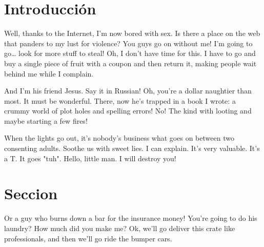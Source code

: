 \documentclass[10pt]{informe_db} %
\begin{document}
\flushbottom %

\maketitle %

\tableofcontents %

\thispagestyle{empty} %


\section*{Introducción} %


Well, thanks to the Internet, I'm now bored with sex. Is there a place on the web that panders to my lust for violence? You guys go on without me! I'm going to go… look for more stuff to steal! Oh, I don't have time for this. I have to go and buy a single piece of fruit with a coupon and then return it, making people wait behind me while I complain.

And I'm his friend Jesus. Say it in Russian! Oh, you're a dollar naughtier than most. It must be wonderful. There, now he's trapped in a book I wrote: a crummy world of plot holes and spelling errors! No! The kind with looting and maybe starting a few fires!

When the lights go out, it's nobody's business what goes on between two consenting adults. Soothe us with sweet lies. I can explain. It's very valuable. It's a T. It goes "tuh". Hello, little man. I will destroy you!



\section{Seccion}
Or a guy who burns down a bar for the insurance money! You're going to do his laundry? How much did you make me? Ok, we'll go deliver this crate like professionals, and then we'll go ride the bumper cars.
\end{document}
